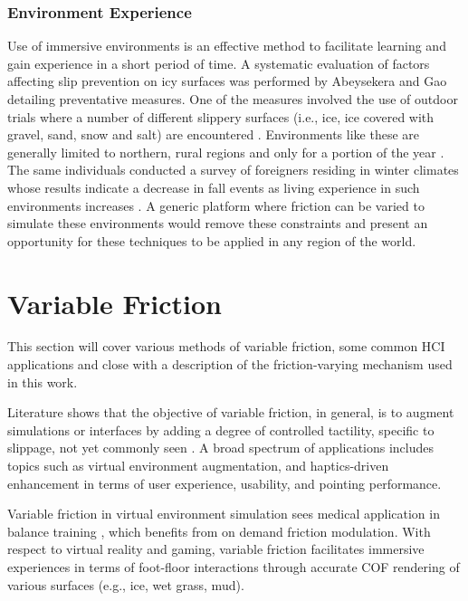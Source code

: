 \documentclass [12pt,letterpaper]{report}
\begin{document}
\subsubsection{Environment Experience}

Use of immersive environments is an effective method to facilitate learning and gain experience in a short period of time. A systematic evaluation of factors affecting slip prevention on icy surfaces was performed by Abeysekera and Gao detailing preventative measures. One of the measures involved the use of outdoor trials where a number of different slippery surfaces (i.e., ice, ice covered with gravel, sand, snow and salt) are encountered \cite{abeysekera2001identification}. Environments like these are generally limited to northern, rural regions and only for a portion of the year \cite{millet2016design}. The same individuals conducted a survey of foreigners residing in winter climates whose results indicate a decrease in fall events as living experience in such environments increases \cite{gao2004slips}. A generic platform where friction can be varied to simulate these environments would remove these constraints and present an opportunity for these techniques to be applied in any region of the world.


\section{Variable Friction}

This section will cover various methods of variable friction, some common HCI applications and close with a description of the friction-varying mechanism used in this work.

Literature shows that the objective of variable friction, in general, is to augment simulations or interfaces by adding a degree of controlled tactility, specific to slippage, not yet commonly seen \cite{levesque2011enhancing,millet2016design}. A broad spectrum of applications includes topics such as virtual environment augmentation, and haptics-driven enhancement in terms of user experience, usability, and pointing performance.

Variable friction in virtual environment simulation sees medical application in balance training \cite{millet2011initial,millet2016design}, which benefits from on demand friction modulation. With respect to virtual reality and gaming, variable friction facilitates immersive experiences in terms of foot-floor interactions through accurate COF rendering of various surfaces (e.g., ice, wet grass, mud). 
\end{document}
